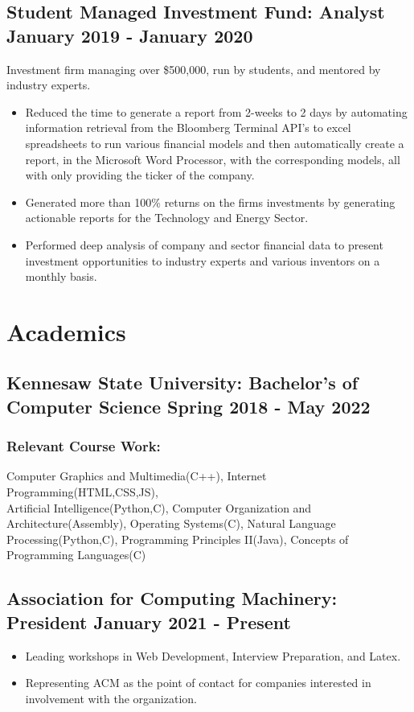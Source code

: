 \documentclass{article}
\begin{document}
\subsection{\large Student Managed Investment Fund: Analyst \hfill \small January 2019 - January 2020}
Investment firm managing over \$500,000, run by students, and mentored by industry experts.
\begin{itemize}
\setlength\itemsep{.1em}
	\item Reduced the time to generate a report from 2-weeks to 2 days by automating information retrieval from the Bloomberg Terminal API's to excel spreadsheets to run various financial models and then automatically create a report, in the Microsoft Word Processor, with the corresponding models, all with only providing the ticker of the company. 
	\item Generated more than 100\% returns on the firms investments by generating actionable reports for the Technology and Energy Sector.
	\item Performed deep analysis of company and sector financial data to present investment opportunities to industry experts and various inventors on a monthly basis. 
\end{itemize}
\section{Academics}
\subsection{\large Kennesaw State University: Bachelor's of Computer Science \hfill \small Spring 2018 - May 2022}
\subsubsection{Relevant Course Work:} Computer Graphics and Multimedia(C++), Internet Programming(HTML,CSS,JS),\\Artificial Intelligence(Python,C), Computer Organization and Architecture(Assembly), Operating Systems(C), Natural Language Processing(Python,C), Programming Principles II(Java), Concepts of Programming Languages(C)
\subsection{\large Association for Computing Machinery: President \hfill \small January 2021 - Present}
\begin{itemize}
\setlength\itemsep{.1em}
	\item  Leading workshops in Web Development, Interview Preparation, and Latex.
	\item Representing ACM as the point of contact for companies interested in involvement with the organization. 
\end{itemize}
\end{document}
